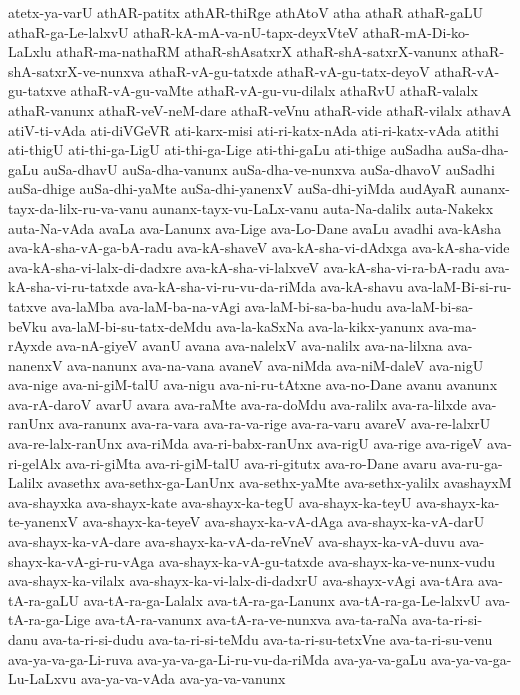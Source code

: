 {atetx-ya-varU
athAR-patitx
athAR-thiRge
athAtoV
atha
athaR
athaR-gaLU
athaR-ga-Le-lalxvU
athaR-kA-mA-va-nU-tapx-deyxVteV
athaR-mA-Di-ko-LaLxlu
athaR-ma-nathaRM
athaR-shAsatxrX
athaR-shA-satxrX-vanunx
athaR-shA-satxrX-ve-nunxva
athaR-vA-gu-tatxde
athaR-vA-gu-tatx-deyoV
athaR-vA-gu-tatxve
athaR-vA-gu-vaMte
athaR-vA-gu-vu-dilalx
athaRvU
athaR-valalx
athaR-vanunx
athaR-veV-neM-dare
athaR-veVnu
athaR-vide
athaR-vilalx
athavA
atiV-ti-vAda
ati-diVGeVR
ati-karx-misi
ati-ri-katx-nAda
ati-ri-katx-vAda
atithi
ati-thigU
ati-thi-ga-LigU
ati-thi-ga-Lige
ati-thi-gaLu
ati-thige
auSadha
auSa-dha-gaLu
auSa-dhavU
auSa-dha-vanunx
auSa-dha-ve-nunxva
auSa-dhavoV
auSadhi
auSa-dhige
auSa-dhi-yaMte
auSa-dhi-yanenxV
auSa-dhi-yiMda
audAyaR
aunanx-tayx-da-lilx-ru-va-vanu
aunanx-tayx-vu-LaLx-vanu
auta-Na-dalilx
auta-Nakekx
auta-Na-vAda
avaLa
ava-Lanunx
ava-Lige
ava-Lo-Dane
avaLu
avadhi
ava-kAsha
ava-kA-sha-vA-ga-bA-radu
ava-kA-shaveV
ava-kA-sha-vi-dAdxga
ava-kA-sha-vide
ava-kA-sha-vi-lalx-di-dadxre
ava-kA-sha-vi-lalxveV
ava-kA-sha-vi-ra-bA-radu
ava-kA-sha-vi-ru-tatxde
ava-kA-sha-vi-ru-vu-da-riMda
ava-kA-shavu
ava-laM-Bi-si-ru-tatxve
ava-laMba
ava-laM-ba-na-vAgi
ava-laM-bi-sa-ba-hudu
ava-laM-bi-sa-beVku
ava-laM-bi-su-tatx-deMdu
ava-la-kaSxNa
ava-la-kikx-yanunx
ava-ma-rAyxde
ava-nA-giyeV
avanU
avana
ava-nalelxV
ava-nalilx
ava-na-lilxna
ava-nanenxV
ava-nanunx
ava-na-vana
avaneV
ava-niMda
ava-niM-daleV
ava-nigU
ava-nige
ava-ni-giM-talU
ava-nigu
ava-ni-ru-tAtxne
ava-no-Dane
avanu
avanunx
ava-rA-daroV
avarU
avara
ava-raMte
ava-ra-doMdu
ava-ralilx
ava-ra-lilxde
ava-ranUnx
ava-ranunx
ava-ra-vara
ava-ra-va-rige
ava-ra-varu
avareV
ava-re-lalxrU
ava-re-lalx-ranUnx
ava-riMda
ava-ri-babx-ranUnx
ava-rigU
ava-rige
ava-rigeV
ava-ri-gelAlx
ava-ri-giMta
ava-ri-giM-talU
ava-ri-gitutx
ava-ro-Dane
avaru
ava-ru-ga-Lalilx
avasethx
ava-sethx-ga-LanUnx
ava-sethx-yaMte
ava-sethx-yalilx
avashayxM
ava-shayxka
ava-shayx-kate
ava-shayx-ka-tegU
ava-shayx-ka-teyU
ava-shayx-ka-te-yanenxV
ava-shayx-ka-teyeV
ava-shayx-ka-vA-dAga
ava-shayx-ka-vA-darU
ava-shayx-ka-vA-dare
ava-shayx-ka-vA-da-reVneV
ava-shayx-ka-vA-duvu
ava-shayx-ka-vA-gi-ru-vAga
ava-shayx-ka-vA-gu-tatxde
ava-shayx-ka-ve-nunx-vudu
ava-shayx-ka-vilalx
ava-shayx-ka-vi-lalx-di-dadxrU
ava-shayx-vAgi
ava-tAra
ava-tA-ra-gaLU
ava-tA-ra-ga-Lalalx
ava-tA-ra-ga-Lanunx
ava-tA-ra-ga-Le-lalxvU
ava-tA-ra-ga-Lige
ava-tA-ra-vanunx
ava-tA-ra-ve-nunxva
ava-ta-raNa
ava-ta-ri-si-danu
ava-ta-ri-si-dudu
ava-ta-ri-si-teMdu
ava-ta-ri-su-tetxVne
ava-ta-ri-su-venu
ava-ya-va-ga-Li-ruva
ava-ya-va-ga-Li-ru-vu-da-riMda
ava-ya-va-gaLu
ava-ya-va-ga-Lu-LaLxvu
ava-ya-va-vAda
ava-ya-va-vanunx
}
